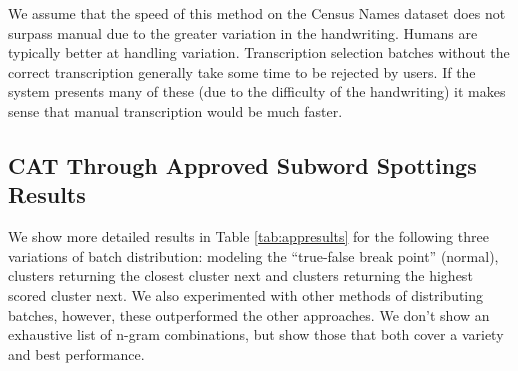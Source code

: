 \documentclass[ms,electronic,twosidetoc,letterpaper,chaptercenter,parttop,lof,lot]{byumsphd}
\begin{document}
We assume that the speed of this method on the Census Names dataset does not surpass manual due to the greater variation in the handwriting. Humans are typically better at handling variation. Transcription selection batches without the correct transcription generally take some time to be rejected by users. If the system presents many of these (due to the difficulty of the handwriting) it makes sense that manual transcription would be much faster.

\subsection{CAT Through Approved Subword Spottings Results}

We show more detailed results in Table \ref{tab:appresults} for the following three variations of batch distribution: modeling the ``true-false break point'' (normal), clusters returning the closest cluster next and clusters returning the highest scored cluster next. We also experimented with other methods of distributing batches, however, these outperformed the other approaches. We don't show an exhaustive list of n-gram combinations, but show those that both cover a variety and best performance.
\end{document}
